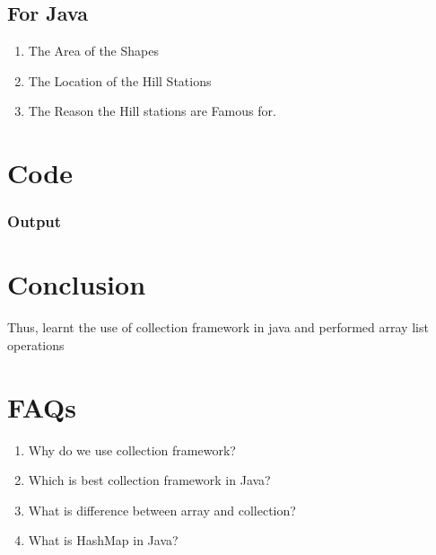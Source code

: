 \documentclass[11pt]{article}
\begin{document}
\subsection*{For Java}
\begin{enumerate}
	\item The Area of the Shapes
	\item The Location of the Hill Stations
	\item The Reason the Hill stations are Famous for.
\end{enumerate}


\section{Code}

\subsubsection{Output}



\section{Conclusion}
Thus, learnt the use of collection framework in java and performed array list operations
\pagebreak

\section{FAQs}

\begin{enumerate}
	\item Why do we use collection framework?

	\item Which is best collection framework in Java?

	\item What is difference between array and collection?

	\item What is HashMap in Java?

\end{enumerate}
\end{document}
